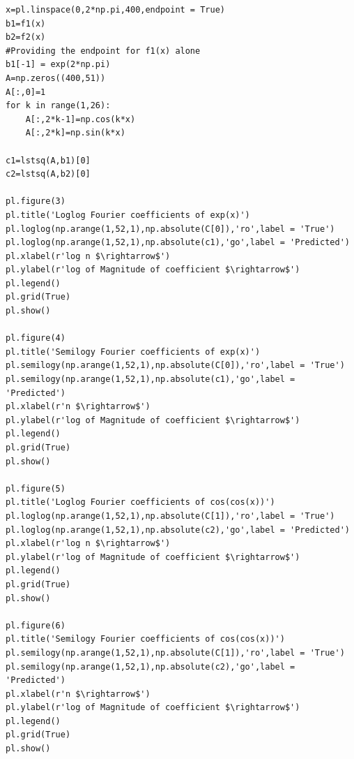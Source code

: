 \documentclass[11pt, a4paper]{article}
\begin{document}
\begin{verbatim}
x=pl.linspace(0,2*np.pi,400,endpoint = True)
b1=f1(x) 
b2=f2(x)
#Providing the endpoint for f1(x) alone
b1[-1] = exp(2*np.pi)
A=np.zeros((400,51))
A[:,0]=1
for k in range(1,26):
	A[:,2*k-1]=np.cos(k*x) 
	A[:,2*k]=np.sin(k*x) 
	
c1=lstsq(A,b1)[0]
c2=lstsq(A,b2)[0]

pl.figure(3)
pl.title('Loglog Fourier coefficients of exp(x)')
pl.loglog(np.arange(1,52,1),np.absolute(C[0]),'ro',label = 'True')
pl.loglog(np.arange(1,52,1),np.absolute(c1),'go',label = 'Predicted')
pl.xlabel(r'log n $\rightarrow$')
pl.ylabel(r'log of Magnitude of coefficient $\rightarrow$')
pl.legend()
pl.grid(True)
pl.show()

pl.figure(4)
pl.title('Semilogy Fourier coefficients of exp(x)')
pl.semilogy(np.arange(1,52,1),np.absolute(C[0]),'ro',label = 'True')
pl.semilogy(np.arange(1,52,1),np.absolute(c1),'go',label = 'Predicted')
pl.xlabel(r'n $\rightarrow$')
pl.ylabel(r'log of Magnitude of coefficient $\rightarrow$')
pl.legend()
pl.grid(True)
pl.show()

pl.figure(5)
pl.title('Loglog Fourier coefficients of cos(cos(x))')
pl.loglog(np.arange(1,52,1),np.absolute(C[1]),'ro',label = 'True')
pl.loglog(np.arange(1,52,1),np.absolute(c2),'go',label = 'Predicted')
pl.xlabel(r'log n $\rightarrow$')
pl.ylabel(r'log of Magnitude of coefficient $\rightarrow$')
pl.legend()
pl.grid(True)
pl.show()

pl.figure(6)
pl.title('Semilogy Fourier coefficients of cos(cos(x))')
pl.semilogy(np.arange(1,52,1),np.absolute(C[1]),'ro',label = 'True')
pl.semilogy(np.arange(1,52,1),np.absolute(c2),'go',label = 'Predicted')
pl.xlabel(r'n $\rightarrow$')
pl.ylabel(r'log of Magnitude of coefficient $\rightarrow$')
pl.legend()
pl.grid(True)
pl.show()
\end{verbatim}
\end{document}
